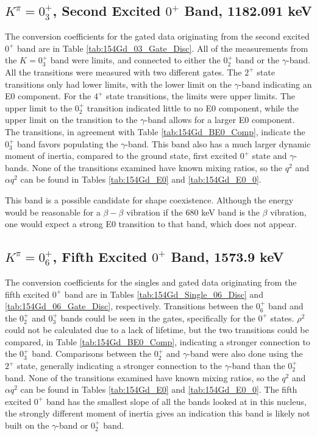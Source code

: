 



\subsection{$K^{\pi}=0^+_3$, Second Excited $0^+$ Band, 1182.091 keV}

The conversion coefficients for the gated data originating from the second excited $0^+$ band are in Table \ref{tab:154Gd_03_Gate_Disc}. All of the measurements from the $K=0^+_3$ band were limits, and connected to either the $0^+_2$ band or the $\gamma$-band. All the transitions were measured with two different gates. The $2^+$ state transitions only had lower limits, with the lower limit on the $\gamma$-band indicating an E0 component. For the $4^+$ state transitions, the limits were upper limits. The upper limit to the $0^+_2$ transition indicated little to no E0 component, while the upper limit on the transition to the $\gamma$-band allows for a larger E0 component. The transitions, in agreement with Table \ref{tab:154Gd_BE0_Comp}, indicate the $0^+_3$ band favors populating the $\gamma$-band. This band also has a much larger dynamic moment of inertia, compared to the ground state, first excited $0^+$ state and $\gamma$-bands. None of the transitions examined have known mixing ratios, so the $q^2$ and $\alpha q^2$ can be found in Tables \ref{tab:154Gd_E0} and \ref{tab:154Gd_E0_0}. 

This band is a possible candidate for shape coexistence. Although the energy would be reasonable for a $\beta-\beta$ vibration if the 680 keV band is the $\beta$ vibration, one would expect a strong E0 transition to that band, which does not appear.



\subsection{$K^{\pi}=0^+_6$, Fifth Excited $0^+$ Band, 1573.9 keV}

The conversion coefficients for the singles and gated data originating from the fifth excited $0^+$ band are in Tables \ref{tab:154Gd_Single_06_Disc} and \ref{tab:154Gd_06_Gate_Disc}, respectively. Transitions between the $0^+_6$ band and the $0^+_2$ and $0^+_3$ bands could be seen in the gates, specifically for the $0^+$ states. $\rho^2$ could not be calculated due to a lack of lifetime, but the two transitions could be compared, in Table \ref{tab:154Gd_BE0_Comp}, indicating a stronger connection to the $0^+_3$ band. Comparisons between the $0^+_2$ and $\gamma$-band were also done using the $2^+$ state, generally indicating a stronger connection to the $\gamma$-band than the $0^+_2$ band. None of the transitions examined have known mixing ratios, so the $q^2$ and $\alpha q^2$ can be found in Tables \ref{tab:154Gd_E0} and \ref{tab:154Gd_E0_0}. The fifth excited $0^+$ band has the smallest slope of all the bands looked at in this nucleus, the strongly different moment of inertia gives an indication this band is likely not built on the $\gamma$-band or $0^+_2$ band.

